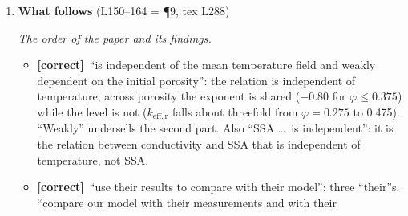 \documentclass[11pt]{article}
\newcommand{\Note}{\textcolor{open}{\textbf{[from the notes]}}\ }
\newcommand{\Pg}[3]{\item \textbf{#1} {\small(#2)}\par\textit{#3}}
\newcommand{\tC}{\textcolor{miss}{\textbf{[correct]}}\ }
\newcommand{\tG}{\textcolor{stale}{\textbf{[wording]}}\ }
\newcommand{\tA}{\textcolor{have}{\textbf{[add]}}\ }
\newcommand{\add}[1]{\textcolor{revB}{#1}}
\newcommand{\del}[1]{\textcolor{red}{[del: #1]}}
\begin{document}
\begin{enumerate}
\begin{itemize}
    density, in two stages (as described by Calonne et al.\ 2014; not yet
    read). Two or three sentences in the paper. The point to set up: under
    a gradient, \del{losing surface area did not raise conductivity} \add{conductivity first fell while SSA fell and rose overall only through the vertical component (Calonne et al.\ 2014, p.16: ``an overall increase \ldots\ at a constant density'')}, because the
    surface was lost by coarsening and bond sublimation, and the change was
    a redistribution between directions. Isothermal sintering loses surface
    at the necks, with no direction imposed.
  \item \tA \textbf{Why SSA} (discussed 10-08; \Note old L562--568). SSA is
    measured in the field and laboratory (Matzl \& Schneebeli, 2006; Gallet
    et al., 2009; Proksch et al., 2015; all in the \texttt{.bib}), so a law
    in SSA can be applied. One sentence.
  \item \tA \textbf{What the conductivity here includes.} \Note Fourteau et
    al.\ (2021) show that vapor transport under a gradient adds to the
    apparent conductivity; the conductivity here is conductive only, which
    is exact for isothermal sintering. One clause here or in Section~2.3.
  \item \tG ``effects'': ``affects''. ``macroscopic bodies of icy porous
    materials'': ``bulk properties of porous ice''. ``here on earth'': ``on
    Earth''. ``Significant work \ldots\ are needed'': ``is needed''.
  \end{itemize}
\Pg{What follows}{L150--164 \add{= \P9, tex L288}}{The order of the paper and its findings.}
  \begin{itemize}
  \item \tC ``is independent of the mean temperature field and weakly
    dependent on the initial porosity'': the relation is independent of
    temperature; across porosity the exponent is shared ($-0.80$ for
    $\varphi \le 0.375$) while the level is not ($k_{\mathrm{eff,r}}$ falls
    about threefold from $\varphi = 0.275$ to 0.475). ``Weakly'' undersells
    the second part. Also ``SSA \ldots\ is independent'': it is the relation
    between conductivity and SSA that is independent of temperature, not
    SSA.
  \item \tC ``use their results to compare with their model'': three
    ``their''s. ``compare our model with their measurements and with their

\end{itemize}
\end{enumerate}
\end{document}
